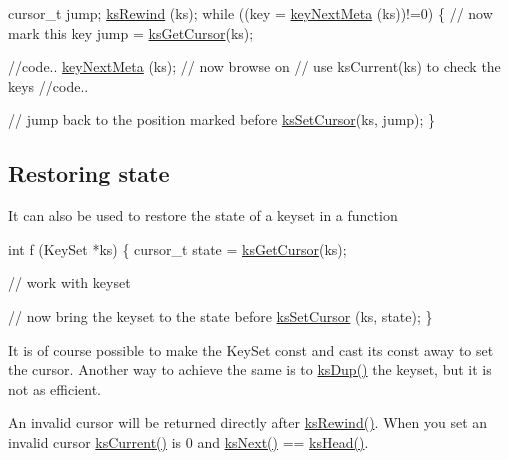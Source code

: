 \begin{DoxyCode}
cursor\_t jump;
\hyperlink{group__keyset_gabe793ff51f1728e3429c84a8a9086b70}{ksRewind} (ks);
\textcolor{keywordflow}{while} ((key = \hyperlink{group__keymeta_ga4c88342f580a4291455a801af71ce048}{keyNextMeta} (ks))!=0)
\{
        \textcolor{comment}{// now mark this key}
        jump = \hyperlink{group__keyset_gaffe507ab9281c322eb16c3e992075d29}{ksGetCursor}(ks);

        \textcolor{comment}{//code..}
        \hyperlink{group__keymeta_ga4c88342f580a4291455a801af71ce048}{keyNextMeta} (ks); \textcolor{comment}{// now browse on}
        \textcolor{comment}{// use ksCurrent(ks) to check the keys}
        \textcolor{comment}{//code..}

        \textcolor{comment}{// jump back to the position marked before}
        \hyperlink{group__keyset_gad94c9ffaa3e8034564c0712fd407c345}{ksSetCursor}(ks, jump);
\}
\end{DoxyCode}
\hypertarget{group__keyset_restore}{}\subsection{Restoring state}\label{group__keyset_restore}
It can also be used to restore the state of a keyset in a function


\begin{DoxyCode}
\textcolor{keywordtype}{int} f (KeySet *ks)
\{
        cursor\_t state = \hyperlink{group__keyset_gaffe507ab9281c322eb16c3e992075d29}{ksGetCursor}(ks);

        \textcolor{comment}{// work with keyset}

        \textcolor{comment}{// now bring the keyset to the state before}
        \hyperlink{group__keyset_gad94c9ffaa3e8034564c0712fd407c345}{ksSetCursor} (ks, state);
\}
\end{DoxyCode}


It is of course possible to make the Key\-Set const and cast its const away to set the cursor. Another way to achieve the same is to \hyperlink{group__keyset_gac59e4b328245463f1451f68d5106151c}{ks\-Dup()} the keyset, but it is not as efficient.

An invalid cursor will be returned directly after \hyperlink{group__keyset_gabe793ff51f1728e3429c84a8a9086b70}{ks\-Rewind()}. When you set an invalid cursor \hyperlink{group__keyset_ga4287b9416912c5f2ab9c195cb74fb094}{ks\-Current()} is 0 and \hyperlink{group__keyset_ga317321c9065b5a4b3e33fe1c399bcec9}{ks\-Next()} == \hyperlink{group__keyset_gae7dbf3aef70e67b5328475eb3d1f92f5}{ks\-Head()}.

